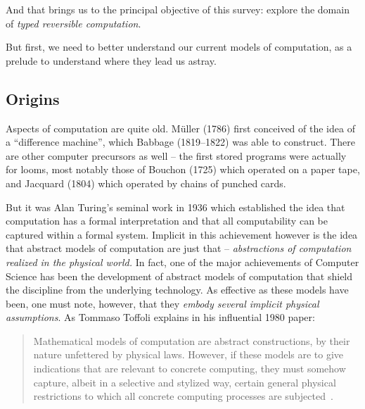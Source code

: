 \documentclass{article}
\begin{document}
And that brings us to the principal objective of this survey: explore the
domain of \emph{typed reversible computation}.

But first, we need to better understand our current models of
computation, as a prelude to understand where they lead us astray.

\subsection{Origins}

Aspects of computation are
quite old. M\"{u}ller (1786) first conceived of the idea of a
``difference machine'', which Babbage (1819--1822) was able to
construct. There are other computer precursors as well -- the first
stored programs were actually for looms, most notably those of
Bouchon (1725) which operated on a paper tape, and Jacquard (1804)
which operated by chains of punched cards.

But it was Alan Turing's seminal work in 1936 which established the idea
that computation has a formal interpretation and that all
computability can be captured within a formal system. Implicit in this
achievement however is the idea that abstract models of computation
are just that -- \emph{abstractions of computation realized in the
physical world.}  In fact, one of the major achievements of Computer
Science has been the development of abstract models of computation
that shield the discipline from the underlying technology. As
effective as these models have been, one must note, however, that they
\emph{embody several implicit physical assumptions}.  As Tommaso
Toffoli explains in his influential 1980 paper:

{\begin{quote} Mathematical models of computation are abstract
  constructions, by their nature unfettered by physical laws. However,
  if these models are to give indications that are relevant to
  concrete computing, they must somehow capture, albeit in a selective
  and stylized way, certain general physical restrictions to which all
  concrete computing processes are subjected~\cite{Toffoli:1980}.
\end{quote}}
\end{document}
